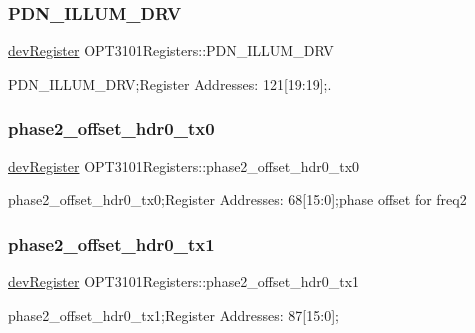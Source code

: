 \subsubsection{\texorpdfstring{P\+D\+N\+\_\+\+I\+L\+L\+U\+M\+\_\+\+D\+RV}{PDN\_ILLUM\_DRV}}
{\footnotesize\ttfamily \mbox{\hyperlink{classdev_register}{dev\+Register}} O\+P\+T3101\+Registers\+::\+P\+D\+N\+\_\+\+I\+L\+L\+U\+M\+\_\+\+D\+RV}



P\+D\+N\+\_\+\+I\+L\+L\+U\+M\+\_\+\+D\+RV;Register Addresses\+: 121\mbox{[}19\+:19\mbox{]};. 

\mbox{\label{class_o_p_t3101_registers_a2d47813676979e52ff81ccb79f403568}} 
\subsubsection{\texorpdfstring{phase2\+\_\+offset\+\_\+hdr0\+\_\+tx0}{phase2\_offset\_hdr0\_tx0}}
{\footnotesize\ttfamily \mbox{\hyperlink{classdev_register}{dev\+Register}} O\+P\+T3101\+Registers\+::phase2\+\_\+offset\+\_\+hdr0\+\_\+tx0}



phase2\+\_\+offset\+\_\+hdr0\+\_\+tx0;Register Addresses\+: 68\mbox{[}15\+:0\mbox{]};phase offset for freq2 

\mbox{\label{class_o_p_t3101_registers_ab1935ee4370a6f750250df8037bfedde}} 
\subsubsection{\texorpdfstring{phase2\+\_\+offset\+\_\+hdr0\+\_\+tx1}{phase2\_offset\_hdr0\_tx1}}
{\footnotesize\ttfamily \mbox{\hyperlink{classdev_register}{dev\+Register}} O\+P\+T3101\+Registers\+::phase2\+\_\+offset\+\_\+hdr0\+\_\+tx1}



phase2\+\_\+offset\+\_\+hdr0\+\_\+tx1;Register Addresses\+: 87\mbox{[}15\+:0\mbox{]}; 

